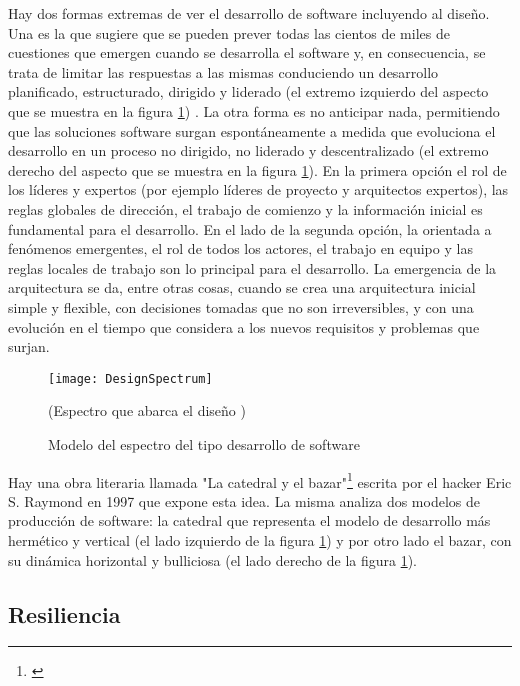 Hay dos formas extremas de ver el desarrollo de software incluyendo al diseño. Una es la que sugiere que se pueden prever todas las cientos de miles de cuestiones que emergen cuando se desarrolla el software y, en consecuencia, se trata de limitar las respuestas a las mismas conduciendo un desarrollo planificado, estructurado, dirigido y liderado (el extremo izquierdo del aspecto que se muestra en la figura \ref{fig:DesignSpectrum}) \cite{Neal-Ford-2010}. La otra forma es no anticipar nada, permitiendo que las soluciones software surgan espontáneamente a medida que evoluciona el desarrollo en un proceso no dirigido, no liderado y descentralizado (el extremo derecho del aspecto que se muestra en la figura \ref{fig:DesignSpectrum}). En la primera opción el rol de los líderes y expertos (por ejemplo líderes de proyecto y arquitectos expertos), las reglas globales de dirección, el trabajo de comienzo y la información inicial es fundamental para el desarrollo. En el lado de la segunda opción, la orientada a fenómenos emergentes, el rol de todos los actores, el trabajo en equipo y las reglas locales de trabajo son lo principal para el desarrollo. La emergencia de la arquitectura se da, entre otras cosas, cuando se crea una arquitectura inicial simple y flexible, con decisiones tomadas que no son irreversibles, y con una evolución en el tiempo que considera a los nuevos requisitos y problemas que surjan.

\begin{figure}[h] 
  \centering
  \texttt{[image: DesignSpectrum]}
  \caption{Modelo del espectro del tipo desarrollo de software}
  (Espectro que abarca el diseño \cite{Neal-Ford-2010})
  \centering
  \label{fig:DesignSpectrum} %
\end{figure}

Hay una obra literaria llamada "La catedral y el bazar"\footnote{\cite{Eric-Raymond-1997}} escrita por el hacker Eric S. Raymond en 1997 que expone esta idea. La misma analiza dos modelos de producción de software: la catedral que representa el modelo de desarrollo más hermético y vertical (el lado izquierdo de la figura \ref{fig:DesignSpectrum}) y por otro lado el bazar, con su dinámica horizontal y bulliciosa (el lado derecho de la figura \ref{fig:DesignSpectrum}).

\subsection{Resiliencia}

